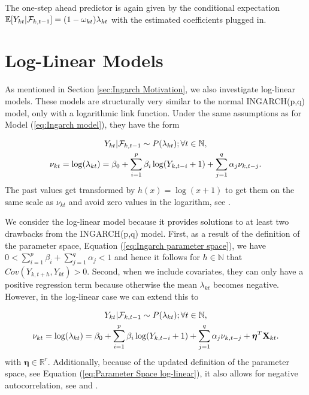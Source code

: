 The one-step ahead predictor is again given by the conditional expectation $\mathbb{E}[Y_{kt} | \mathcal{F}_{k,t-1}] = (1-\omega_{kt})\lambda_{kt} $ with the estimated coefficients plugged in. 

\section{Log-Linear Models}
\label{sec: Log-Linear Models}

As mentioned in Section \ref{sec:Ingarch Motivation}, we also investigate log-linear models. These models are structurally very similar to the normal INGARCH(p,q) model, only with a logarithmic link function. Under the same assumptions as for Model (\ref{eq:Ingarch model}), they have the form 

\begin{equation}
\begin{gathered}
Y_{kt} | \mathcal{F}_{k,t-1} \sim P(\lambda_{kt}); \forall t \in \mathbb{N}, \\
\nu_{kt}= \log(\lambda_{kt}) = \beta_0 + \sum_{i=1}^p\beta_i \log(Y_{k,t-i}+1) + \sum_{j=1}^q\alpha_j \nu_{k,t-j}.
\label{eq:Log-Linear model}
\end{gathered}
\end{equation}
%
The past values get transformed by $h(x)=\log(x+1)$ to get them on the same scale as $\nu_{kt}$ and avoid zero values in the logarithm, see \textcite{Liboschik:2016,Fokianos:2011}. 

We consider the log-linear model because it provides solutions to at least two drawbacks from the INGARCH(p,q) model. First, as a result of the definition of the parameter space, Equation (\ref{eq:Ingarch parameter space}), we have $0 < \sum_{i=1}^p\beta_i + \sum_{j=1}^q\alpha_j < 1$ and hence it follows for $h\in \mathbb{N}$ that $Cov(Y_{k,t+h},Y_{kt})>0$. Second, when we include covariates, they can only have a positive regression term because otherwise the mean $\lambda_{kt}$ becomes negative. However, in the log-linear case we can extend this to

\begin{equation}
\begin{gathered}
Y_{kt} | \mathcal{F}_{k,t-1} \sim P(\lambda_{kt}); \forall t \in \mathbb{N}, \\
\nu_{kt}= \log(\lambda_{kt}) = \beta_0 + \sum_{i=1}^p\beta_i \log(Y_{k,t-i}+1) + \sum_{j=1}^q\alpha_j \nu_{k,t-j} + \bm{\eta}^T\textbf{X}_{kt}.
\label{eq:Log-Linear model external factors}
\end{gathered}
\end{equation}
%
with $\bm{\eta} \in \mathbb{R}^r$. Additionally, because of the updated definition of the parameter space, see Equation (\ref{eq:Parameter Space log-linear}), it also allows for negative autocorrelation, see \textcite{Liboschik:2016} and \textcite{Fokianos:2011}. 

